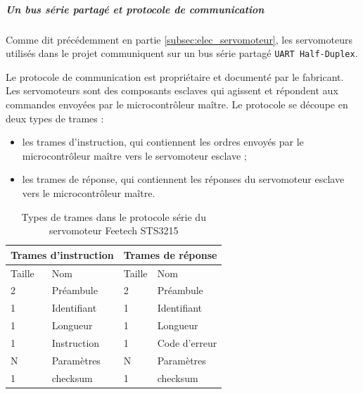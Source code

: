 \vspace{-0.4cm}

\subparagraph*{Un bus série partagé et protocole de communication} Comme dit précédemment en partie \ref{subsec:elec_servomoteur},
les servomoteurs utilisés dans le projet communiquent sur un bus série partagé \texttt{UART Half-Duplex}.

\vspace{0.1cm}

\hspace*{-\parindent}%
\begin{minipage}{0.45\textwidth}
Le protocole de communication est propriétaire et documenté par le fabricant. Les servomoteurs sont des composants esclaves qui
agissent et répondent aux commandes envoyées par le microcontrôleur maître. Le protocole se découpe en deux types de trames :
\begin{itemize}
	\item les trames d'instruction, qui contiennent les ordres envoyés par le microcontrôleur maître vers le servomoteur esclave ;
	\item les trames de réponse, qui contiennent les réponses du servomoteur esclave vers le microcontrôleur maître.
\end{itemize}
\end{minipage}
\hfill
\begin{minipage}{0.5\textwidth}
	\begin{table}[H]
		\centering
		\begin{tabular}{l l | l l}
			\hline
			\multicolumn{2}{l|}{\textbf{Trames d'instruction}} & \multicolumn{2}{l}{\textbf{Trames de réponse}} \\
			\hline
			Taille	& Nom			& Taille	& Nom			\\
			2		& Préambule		& 2			& Préambule		\\
			1		& Identifiant	& 1			& Identifiant	\\
			1		& Longueur		& 1			& Longueur		\\
			1		& Instruction	& 1			& Code d'erreur	\\
			N		& Paramètres	& N			& Paramètres	\\
			1		& checksum		& 1			& checksum		\\
			\hline
		\end{tabular}
		\caption{Types de trames dans le protocole série du servomoteur Feetech STS3215}
		\label{tab:sts_trames}
	\end{table}
\end{minipage}

